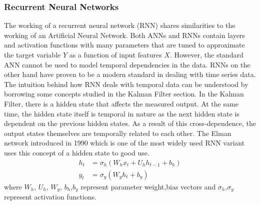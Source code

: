 \documentclass{article}
\begin{document}
\subsubsection{Recurrent Neural Networks}
The working of a recurrent neural network (RNN) shares similarities to the working of an Artificial Neural Network. Both ANNs and RNNs contain layers and activation functions with many parameters that are tuned to approximate the target variable $Y$ as a function of input features $X$. However, the standard ANN cannot be used to model temporal dependencies in the data. RNNs on the other hand have proven to be a modern standard in dealing with time series data. The intuition behind how RNN deals with temporal data can be understood by borrowing some concepts studied in the Kalman Filter section. In the Kalman Filter, there is a hidden state that affects the measured output. At the same time, the hidden state itself is temporal in nature as the next hidden state is dependent on the previous hidden states. As a result of this cross-dependence, the output states themselves are temporally related to each other. The Elman network \cite{miikkulainen_simple_2010} introduced in 1990 which is one of the most widely used RNN variant uses this concept of a hidden state to good use. 
\begin{equation}
\begin{split}
    h_t&=\sigma_h(W_hx_t+U_{h}h_{t-1}+b_h)\\
    y_t&=\sigma_y(W_yh_t+b_y)
\end{split}
\end{equation}
where $W_h$, $U_h$, $W_y$, $b_h$,$b_y$ represent parameter weight,bias vectors and $\sigma_h$,$\sigma_y$ represent activation functions. 
\end{document}
